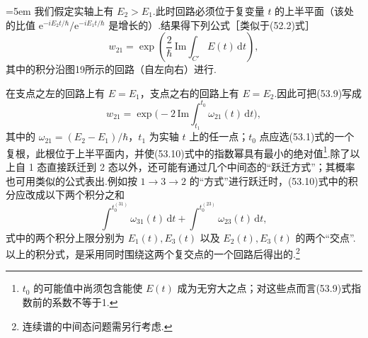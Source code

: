 \emergencystretch=5em%
我们假定实轴上有 $E_2>E_1$.此时回路必须位于复变量 $t$ 的上半平面（该处的比值 $\mathrm{e}^{-iE_2t/\hbar}/\mathrm{e}^{-iE_1t/\hbar}$ 是增长的）.结果得下列公式［类似于(52.2)式］
\begin{equation}
  w_{21}=\exp\left(\frac{2}{\hbar}\,\mathrm{Im}\int_{C'}E(t)\,\mathrm{d}t\right),
\end{equation}
\emergencystretch=0pt%
其中的积分沿图19所示的回路（自左向右）进行.

在支点之左的回路上有 $E=E_1$，支点之右的回路上有 $E=E_2$.因此可把(53.9)写成
\begin{equation}
  w_{21}=\exp\bigg(-2\,\mathrm{Im}\int_{t_1}^{t_0}\omega_{21}(t)\,\mathrm{d}t\bigg),
\end{equation}
其中的 $\omega_{21}=(E_2-E_1)/\hbar$，$t_1$ 为实轴 $t$ 上的任一点；$t_0$ 点应选(53.1)式的一个复根，此根位于上半平面内，并使(53.10)式中的指数幂具有最小的绝对值\footnote{$t_0$ 的可能值中尚须包含能使 $E(t)$ 成为无穷大之点；对这些点而言(53.9)式指数前的系数不等于1.}.除了以上自 1 态直接跃迁到 2 态以外，还可能有通过几个中间态的“跃迁方式”；其概率也可用类似的公式表出.例如按 $1\to3\to2$ 的“方式”进行跃迁时，(53.10)式中的积分应改成以下两个积分之和
\begin{equation*}
  \int^{t_0^{(31)}}\omega_{31}(t)\,\mathrm{d}t
  +\int^{t_0^{(23)}}\omega_{23}(t)\,\mathrm{d}t,
\end{equation*}
式中的两个积分上限分别为 $E_1(t),E_3(t)$ 以及 $E_2(t),E_3(t)$ 的两个“交点”.以上的积分式，是采用同时围绕这两个复交点的一个回路后得出的.\footnote{连续谱的中间态问题需另行考虑.}

